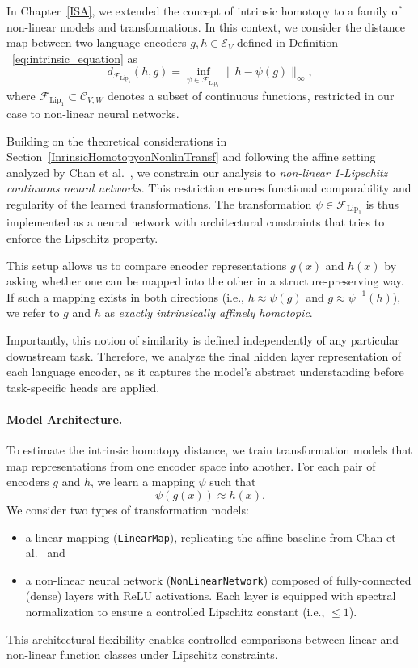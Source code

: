 In Chapter~\ref{ISA}, we extended the concept of intrinsic homotopy to a family of non-linear models and transformations.  
In this context, we consider the distance map between two language encoders \( g, h \in \mathcal{E}_V \) defined in Definition ~\ref{eq:intrinsic_equation} as
\[
d_{\mathcal{F}_{\mathrm{Lip}_1}}(h, g) = \inf_{\psi \in \mathcal{F}_{\mathrm{Lip}_1}} \|h - \psi(g)\|_\infty,
\]
where \( \mathcal{F}_{\mathrm{Lip}_1} \subset \mathcal{C}_{V,W} \) denotes a subset of continuous functions, restricted in our case to non-linear neural networks.

Building on the theoretical considerations in Section~\ref{InrinsicHomotopyonNonlinTransf} and following the affine setting analyzed by Chan et al.~\cite{chan_affine_2024}, we constrain our analysis to \emph{non-linear 1-Lipschitz continuous neural networks}.  
This restriction ensures functional comparability and regularity of the learned transformations. The transformation \( \psi \in \mathcal{F}_{\mathrm{Lip}_1} \) is thus implemented as a neural network with architectural constraints that tries to enforce the Lipschitz property.

This setup allows us to compare encoder representations \( g(x) \) and \( h(x) \) by asking whether one can be mapped into the other in a structure-preserving way.  
If such a mapping exists in both directions (i.e., \( h \approx \psi(g) \) and \( g \approx \psi^{-1}(h) \)), we refer to \( g \) and \( h \) as \emph{exactly intrinsically affinely homotopic}.

Importantly, this notion of similarity is defined independently of any particular downstream task. Therefore, we analyze the final hidden layer representation of each language encoder, as it captures the model's abstract understanding before task-specific heads are applied.

\paragraph{Model Architecture.}
To estimate the intrinsic homotopy distance, we train transformation models that map representations from one encoder space into another. For each pair of encoders \( g \) and \( h \), we learn a mapping \( \psi \) such that
\[
\psi(g(x)) \approx h(x).
\]
We consider two types of transformation models:
\begin{itemize}
    \item a linear mapping (\texttt{LinearMap}), replicating the affine baseline from Chan et al.~\cite{chan_affine_2024} and
    \item a non-linear neural network (\texttt{NonLinearNetwork}) composed of fully-connected (dense) layers with ReLU activations. 
    Each layer is equipped with spectral normalization to ensure a controlled Lipschitz constant (i.e., \( \leq 1 \)).
\end{itemize}
This architectural flexibility enables controlled comparisons between linear and non-linear function classes under Lipschitz constraints.

